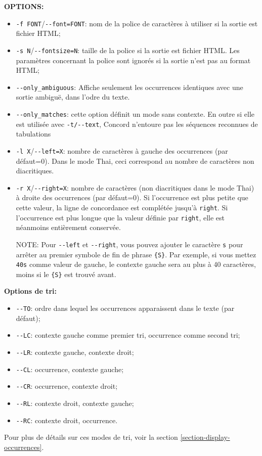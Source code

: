 \bigskip
\noindent \textbf{OPTIONS:}
\begin{itemize}
  \item \verb+-f FONT+/\verb+--font=FONT+: nom de la police de caractères à utiliser si la
  	  sortie est fichier HTML;
  \item \verb+-s N+/\verb+--fontsize=N+: taille de la police si la sortie est fichier HTML.
  	Les paramètres concernant la police sont ignorés si la sortie n’est pas au format HTML;
  \item \verb+--only_ambiguous+: Affiche seulement les occurrences identiques avec une sortie
  	  ambiguë, dans l'odre du texte.
  \item \verb+--only_matches+: cette option définit un mode sans contexte.
	En outre si elle est utilisée avec \verb+-t/--text+, Concord n'entoure pas les séquences
	reconnues de tabulations
  \item \verb+-l X+/\verb+--left=X+: nombre de caractères à gauche des occurrences (par défaut=0).
  	  Dans le mode Thai, ceci correspond au nombre de caractères non
  	  diacritiques.
  \item \verb+-r X+/\verb+--right=X+: nombre de caractères (non diacritiques dans le mode Thai)
	à droite des occurrences (par défaut=0). Si l'occurrence est plus petite que cette valeur,
	la ligne de concordance est complétée jusqu'à \verb+right+. Si l'occurrence est plus longue
	que la valeur définie par \verb+right+, elle est néanmoins entièrement conservée.
  
  \bigskip
  NOTE: Pour \verb+--left+ et \verb+--right+, vous pouvez ajouter le caractère \verb+s+
  pour arrêter au premier symbole de fin de phrase \verb+{S}+. Par exemple, si vous mettez 
  \verb+40s+ comme valeur de gauche, le contexte gauche sera au plus à 40 caractères, moins si le \verb+{S}+ est trouvé avant.
\end{itemize}

\bigskip
\noindent \textbf{Options de tri:}
\begin{itemize}
  \item \verb+--TO+: ordre dans lequel les occurrences apparaissent dans le texte (par défaut);
  \item \verb+--LC+: contexte gauche comme premier tri, occurrence comme second tri;
  \item \verb+--LR+: contexte gauche, contexte droit;
  \item \verb+--CL+: occurrence, contexte gauche;
  \item \verb+--CR+: occurrence, contexte droit;
  \item \verb+--RL+: contexte droit, contexte gauche;
  \item \verb+--RC+: contexte droit, occurrence.
\end{itemize}
\noindent Pour plus de détails sur ces modes de tri, voir la section
\ref{section-display-occurrences}.

